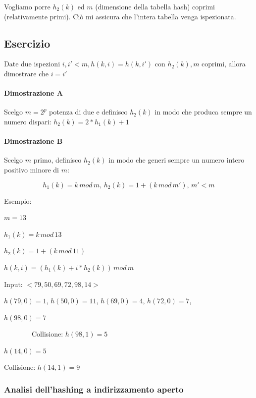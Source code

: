 \documentclass[tikz]{article}
\let\oldparagraph\paragraph
\renewcommand{\paragraph}[1]{\oldparagraph{#1}\mbox{}}
\begin{document}
{Vogliamo porre $h_2(k)$ ed $m$ (dimensione della tabella hash) coprimi (relativamente primi). Ciò mi assicura che l'intera tabella venga ispezionata.}

\subsection{Esercizio}

{Date due ispezioni $i,i' < m, h(k,i) = h(k,i')$ con $h_2(k),m$ coprimi, allora dimostrare che $i=i'$}

\paragraph{Dimostrazione A}

{Scelgo $m=2^p$ potenza di due e definisco $h_2(k)$ in modo che produca sempre un numero dispari: $h_2(k) = 2*h_1(k)+1$}

\paragraph{Dimostrazione B}

{Scelgo $m$ primo, definisco $h_2(k)$ in modo che generi sempre un numero intero positivo minore di $m$:}

\begin{equation}
h_1(k)=k\,mod\,m,\,h_2(k)=1+(k\,mod\,m'),\,m' < m
\end{equation}

{Esempio:}

$m=13$

$h_1(k)=k\,mod\,13$

$h_2(k)=1 + (k\,mod\,11)$

$h(k,i) = (h_1(k) + i * h_2(k))\,mod\,m$

{Input: $<79,50,69,72,98,14>$}

$h(79,0)=1$, $h(50,0)=11$, $h(69,0)=4$, $h(72,0)=7$, 

$h(98,0)=7$

{~~~~~~~~Collisione: $h(98,1) = 5$}

$h(14,0)=5$

{Collisione: $h(14,1) = 9$}

\hypertarget{h.wkyvylqq2lrt}{\subsubsection{\texorpdfstring{{Analisi dell'hashing a indirizzamento aperto}}{Analisi dell'hashing a indirizzamento aperto}}\label{h.wkyvylqq2lrt}}
\end{document}
